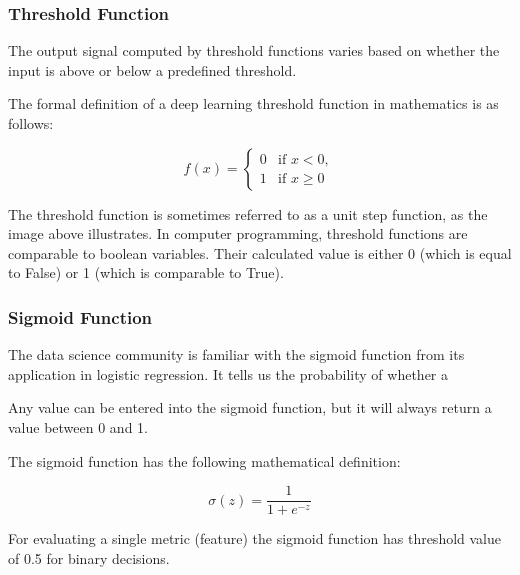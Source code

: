 \subsubsection*{Threshold Function}
The output signal computed by threshold functions varies based on whether the input is above or below a predefined threshold. 

The formal definition of a deep learning threshold function in mathematics is as follows:

\begin{equation}
f(x) =
\begin{cases}
	0 & \text{if } x < 0,\\
	1 & \text{if } x \geq 0
\end{cases}
\end{equation}



\begin{figure}[htp]
	\centering
{}
\end{figure}


The threshold function is sometimes referred to as a unit step function, as the image above illustrates. In computer programming, threshold functions are comparable to boolean variables. Their calculated value is either 0 (which is equal to False) or 1 (which is comparable to True).


\subsubsection*{Sigmoid Function}
The data science community is familiar with the sigmoid function from its application in logistic regression. It tells us the probability of whether a 

Any value can be entered into the sigmoid function, but it will always return a value between 0 and 1.

The sigmoid function has the following mathematical definition:

\begin{equation}
	\sigma(z) = \frac{1} {1 + e^{-z}}
\end{equation}

For evaluating a single metric (feature) the sigmoid function has threshold value of 0.5 for binary decisions. 

